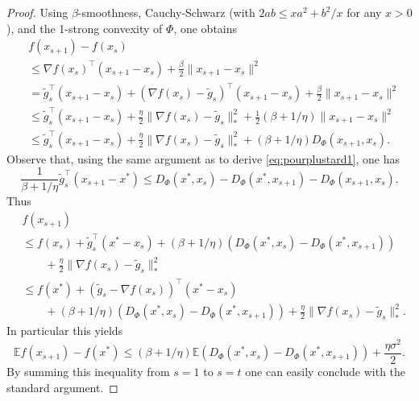 \documentclass[openany]{now}
\newcommand{\tg}{\tilde{g}}
\newcommand{\E}{\mathbb{E}}
\renewcommand{\tilde}{\widetilde}
\begin{document}
\begin{proof}
Using $\beta$-smoothness, Cauchy-Schwarz (with $2 ab \leq x a^2+ b^2 / x$ for any $x >0$), and the 1-strong convexity of $\Phi$, one obtains
\begin{align*}
& f(x_{s+1}) - f(x_s) \\
& \leq \nabla f(x_s)^{\top} (x_{s+1} - x_s) + \frac{\beta}{2} \|x_{s+1} - x_s\|^2 \\
& = \tg_s^{\top} (x_{s+1} - x_s) + (\nabla f(x_s) - \tg_s)^{\top} (x_{s+1} - x_s) + \frac{\beta}{2} \|x_{s+1} - x_s\|^2 \\
& \leq \tg_s^{\top} (x_{s+1} - x_s) + \frac{\eta}{2} \|\nabla f(x_s) - \tg_s\|_*^2 + \frac12 (\beta + 1/\eta) \|x_{s+1} - x_s\|^2 \\
& \leq \tg_s^{\top} (x_{s+1} - x_s) + \frac{\eta}{2} \|\nabla f(x_s) - \tg_s\|_*^2 + (\beta + 1/\eta) D_{\Phi}(x_{s+1}, x_s) .
\end{align*}
Observe that, using the same argument as to derive \eqref{eq:pourplustard1}, one has
$$\frac{1}{\beta + 1/\eta} \tg_s^{\top} (x_{s+1} - x^*) \leq D_{\Phi} (x^*, x_s) - D_{\Phi}(x^*, x_{s+1}) - D_{\Phi}(x_{s+1}, x_s) .$$
Thus
\begin{align*}
& f(x_{s+1}) \\
 & \leq f(x_s) + \tg_s^{\top}(x^* - x_s) + (\beta + 1/\eta) \left(D_{\Phi} (x^*, x_s) - D_{\Phi}(x^*, x_{s+1})\right) \\
& \qquad + \frac{\eta}{2} \|\nabla f(x_s) - \tg_s\|_*^2 \\
& \leq f(x^*) + (\tg_s-\nabla f(x_s))^{\top}(x^* - x_s) \\
& \qquad + (\beta + 1/\eta) \left(D_{\Phi} (x^*, x_s) - D_{\Phi}(x^*, x_{s+1})\right) + \frac{\eta}{2} \|\nabla f(x_s) - \tg_s\|_*^2 .
\end{align*}
In particular this yields
$$\E f(x_{s+1}) - f(x^*) \leq (\beta + 1/\eta) \E \left(D_{\Phi} (x^*, x_s) - D_{\Phi}(x^*, x_{s+1})\right) + \frac{\eta \sigma^2}{2} .$$
By summing this inequality from $s=1$ to $s=t$ one can easily conclude with the standard argument.
\end{proof}
\end{document}
